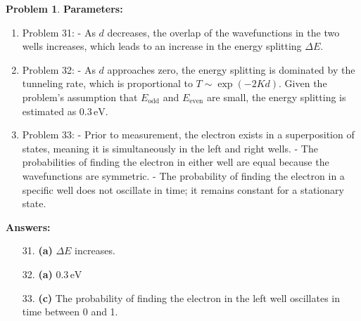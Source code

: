 \documentclass[12pt]{article}
\theoremstyle{definition} %
\newtheorem{problem}{Problem}
\theoremstyle{plain} %
\begin{document}
\begin{problem}
\textbf{Parameters:}
\begin{enumerate}
    \item Problem 31:
    - As \(d\) decreases, the overlap of the wavefunctions in the two wells increases, which leads to an increase in the energy splitting \(\Delta E\).

    \item Problem 32:
    - As \(d\) approaches zero, the energy splitting is dominated by the tunneling rate, which is proportional to \(T \sim \exp(-2K d)\). Given the problem's assumption that \(E_{\text{odd}}\) and \(E_{\text{even}}\) are small, the energy splitting is estimated as \(0.3 \, \text{eV}\).

    \item Problem 33:
    - Prior to measurement, the electron exists in a superposition of states, meaning it is simultaneously in the left and right wells.
    - The probabilities of finding the electron in either well are equal because the wavefunctions are symmetric.
    - The probability of finding the electron in a specific well does not oscillate in time; it remains constant for a stationary state.
\end{enumerate}

\textbf{Answers:}
\begin{enumerate}
    \item[31.] \textbf{(a)} \(\Delta E\) increases.
    \item[32.] \textbf{(a)} \(0.3 \, \text{eV}\)
    \item[33.] \textbf{(c)} The probability of finding the electron in the left well oscillates in time between 0 and 1.
\end{enumerate}

\end{problem}
\end{document}
